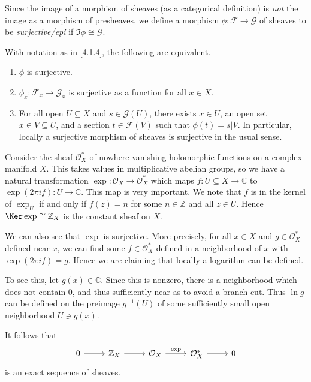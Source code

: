 \begin{definition}\label{4.1.4}
	Since the image of a morphism of sheaves (as a categorical definition) is \emph{not} the image as a morphism of presheaves, we define a morphism $\phi : \mathcal{F}  \to \mathcal{G} $ of sheaves to be \emph{surjective/epi} if $\Im \phi \cong \mathcal{G} $.
\end{definition}
\begin{exercise}\label{4.1.5}
	With notation as in \cref{4.1.4}, the following are equivalent.
	\begin{enumerate}
		\item $\phi $ is surjective.
		\item $\phi _x : \mathcal{F} _x \to \mathcal{G} _x$ is surjective as a function for all $x\in X$.
		\item For all open $U\subseteq X$ and $s\in \mathcal{G} (U)$, there exists $x\in U$, an open set $x\in V \subseteq U$, and a section $t\in \mathcal{F} (V)$ such that $\phi (t)=s|V$. In particular, locally a surjective morphism of sheaves is surjective in the usual sense.
	\end{enumerate}
\end{exercise}

\begin{example}\label{4.1.6}
	Consider the sheaf $\mathcal{O} ^*_X$ of nowhere vanishing holomorphic functions on a complex manifold $X$. This takes values in multiplicative abelian groups, so we have a natural transformation $\exp : \mathcal{O} _X \to \mathcal{O} ^*_X$ which maps $f : U\subseteq X \to \mathbb{C} $ to $\exp (2\pi if) : U \to \mathbb{C} $. This map is very important. We note that $f$ is in the kernel of $\exp _U$ if and only if $f(z)=n$ for some $n\in\mathbb{Z} $ and all $z\in U$. Hence $\Ker \exp \cong \mathbb{Z} _X$ is the constant sheaf on $X$.

	We can also see that $\exp $ is surjective. More precisely, for all $x\in X$ and $g\in \mathcal{O} _X^*$ defined near $x$, we can find some $f\in \mathcal{O} _X^*$ defined in a neighborhood of $x$ with $\exp(2\pi if)=g$. Hence we are claiming that locally a logarithm can be defined.

	To see this, let $g(x)\in\mathbb{C} $. Since this is nonzero, there is a neighborhood which does not contain $0$, and thus sufficiently near as to avoid a branch cut. Thus $\ln g$ can be defined on the preimage $g^{-1} (U)$ of some sufficiently small open neighborhood $U\ni g(x)$.

	It follows that
	\[\begin{tikzcd}[row sep = 2.5em, column sep = 2.5em]
	0\ar[r]  & \mathbb{Z} _X\ar[r]  & \mathcal{O} _X\ar[" \exp  ", r]  & \mathcal{O} _X^*\ar[r]  & 0
	\end{tikzcd}\]
	is an exact sequence of sheaves.
\end{example}

